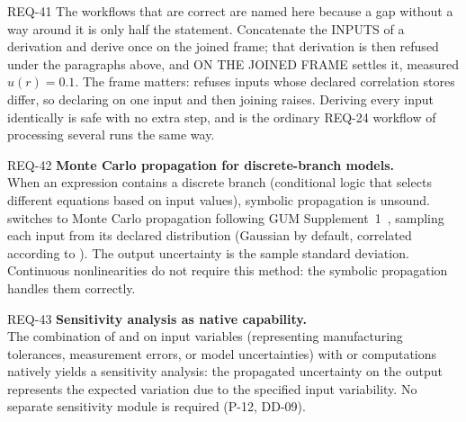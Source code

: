 \begin{reqbox}{REQ-41}{\stable}
The workflows that are correct are named here because a gap without a
way around it is only half the statement. Concatenate the INPUTS of a
derivation and derive once on the joined frame; that derivation is then
refused under the paragraphs above, and  ON THE
JOINED FRAME settles it, measured $u(r) = 0.1$. The frame matters:
 refuses inputs whose declared correlation stores differ,
so declaring on one input and then joining raises. Deriving every input
identically is safe with no extra step, and is the ordinary REQ-24
workflow of processing several runs the same way.
\end{reqbox}

\begin{reqbox}{REQ-42}{\stable}
\textbf{Monte Carlo propagation for discrete-branch models.}\\
When an expression contains a discrete branch (conditional logic that
selects different equations based on input values), symbolic propagation
is unsound.  switches
to Monte Carlo propagation following GUM Supplement~1~\citep{gum2008s1},
sampling each input from its declared distribution (Gaussian by default,
correlated according to ). The output uncertainty
is the sample standard deviation. Continuous nonlinearities do not require
this method: the symbolic propagation handles them correctly.
\end{reqbox}

\begin{reqbox}{REQ-43}{\stable}
\textbf{Sensitivity analysis as native capability.}\\
The combination of  and 
on input variables (representing manufacturing tolerances, measurement
errors, or model uncertainties) with  or 
computations natively yields a sensitivity analysis: the propagated
uncertainty on the output represents the expected variation due to the
specified input variability. No separate sensitivity module is required
(P-12, DD-09).
\end{reqbox}

